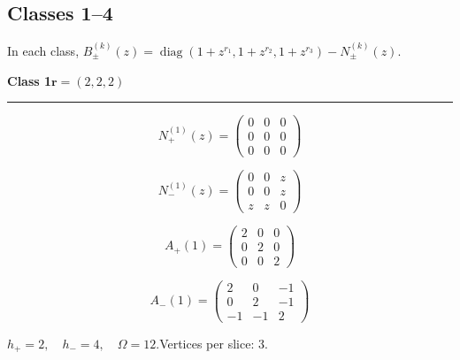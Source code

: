 \subsection*{Classes 1--4}
\noindent In each class, $B_\pm^{(k)}(z)=\operatorname{diag}(1+z^{r_1},1+z^{r_2},1+z^{r_3})-N_\pm^{(k)}(z)$.\par\medskip
\noindent\begin{minipage}{\linewidth}
\noindent\textbf{Class 1}\hfill $\symbf{r}=(2,2,2)$
\par\smallskip\noindent\textcolor{rulegray}{\rule{\linewidth}{0.3pt}}
\begin{minipage}[c]{0.495\linewidth}\centering\fontsize{10.5}{13}\selectfont
\setlength{\abovedisplayskip}{3pt}\setlength{\belowdisplayskip}{3pt}
\setlength{\abovedisplayshortskip}{3pt}\setlength{\belowdisplayshortskip}{3pt}
\setlength{\arraycolsep}{3.5pt}\renewcommand{\arraystretch}{1.18}
\[N_{+}^{(1)}(z)=\begin{pmatrix}0 & 0 & 0\\0 & 0 & 0\\0 & 0 & 0\end{pmatrix}\]
\end{minipage}%
\begin{minipage}[c]{0.495\linewidth}\centering\fontsize{10.5}{13}\selectfont
\setlength{\abovedisplayskip}{3pt}\setlength{\belowdisplayskip}{3pt}
\setlength{\abovedisplayshortskip}{3pt}\setlength{\belowdisplayshortskip}{3pt}
\setlength{\arraycolsep}{3.5pt}\renewcommand{\arraystretch}{1.18}
\[N_{-}^{(1)}(z)=\begin{pmatrix}0 & 0 & z\\0 & 0 & z\\z & z & 0\end{pmatrix}\]
\end{minipage}%
\par\noindent
\begin{minipage}[c]{0.495\linewidth}\centering\fontsize{10.5}{13}\selectfont
\setlength{\abovedisplayskip}{3pt}\setlength{\belowdisplayskip}{3pt}
\setlength{\abovedisplayshortskip}{3pt}\setlength{\belowdisplayshortskip}{3pt}
\setlength{\arraycolsep}{3.5pt}\renewcommand{\arraystretch}{1.18}
\[A_{+}(1)=\begin{pmatrix}2 & 0 & 0\\0 & 2 & 0\\0 & 0 & 2\end{pmatrix}\]
\end{minipage}%
\begin{minipage}[c]{0.495\linewidth}\centering\fontsize{10.5}{13}\selectfont
\setlength{\abovedisplayskip}{3pt}\setlength{\belowdisplayskip}{3pt}
\setlength{\abovedisplayshortskip}{3pt}\setlength{\belowdisplayshortskip}{3pt}
\setlength{\arraycolsep}{3.5pt}\renewcommand{\arraystretch}{1.18}
\[A_{-}(1)=\begin{pmatrix}2 & 0 & -1\\0 & 2 & -1\\-1 & -1 & 2\end{pmatrix}\]
\end{minipage}%
\par\smallskip\noindent\small $h_+=2,\quad h_-=4,\quad \Omega=12.$\quad Vertices per slice: 3.
\end{minipage}\par\vfill
